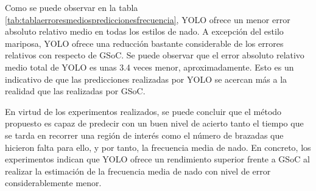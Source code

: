 Como se puede observar en la tabla \ref{tab:tablaerroresmediosprediccionesfrecuencia}, YOLO ofrece un menor error absoluto relativo medio en todas los estilos de nado. A excepción del estilo mariposa, YOLO ofrece una reducción bastante considerable de los errores relativos con respecto de GSoC. Se puede observar que el error absoluto relativo medio total de YOLO es unas 3.4 veces menor, aproximadamente. Esto es un indicativo de que las predicciones realizadas por YOLO se acercan más a la realidad que las realizadas por GSoC.

En virtud de los experimentos realizados, se puede concluir que el método propuesto es capaz de predecir con un buen nivel de acierto tanto el tiempo que se tarda en recorrer una región de interés como el número de brazadas que hicieron falta para ello, y por tanto, la frecuencia media de nado. En concreto, los experimentos indican que YOLO ofrece un rendimiento superior frente a GSoC al realizar la estimación de la frecuencia media de nado con nivel de error considerablemente menor.
